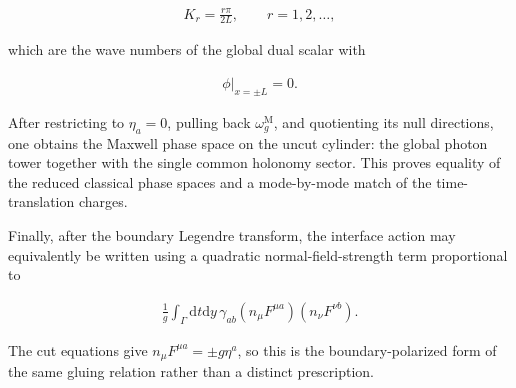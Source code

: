 \begin{align}
K_r=\frac{r\pi}{2L},
\qquad
r=1,2,\ldots,
\end{align}

which are the wave numbers of the global dual scalar with

\begin{align}
\phi\big|_{x=\pm L}=0.
\end{align}

After restricting to $\eta_a=0$, pulling back $\omega_g^{\mathrm M}$, and quotienting its null directions, one obtains the Maxwell phase space on the uncut cylinder: the global photon tower together with the single common holonomy sector. This proves equality of the reduced classical phase spaces and a mode-by-mode match of the time-translation charges.

Finally, after the boundary Legendre transform, the interface action may equivalently be written using a quadratic normal-field-strength term proportional to

\begin{align}
\frac1g\int_\Gamma\mathrm dt\mathrm dy\,
\gamma_{ab}
(n_\mu F^{\mu a})(n_\nu F^{\nu b}).
\end{align}

The cut equations give $n_\mu F^{\mu a}=\pm g\eta^a$, so this is the boundary-polarized form of the same gluing relation rather than a distinct prescription.
